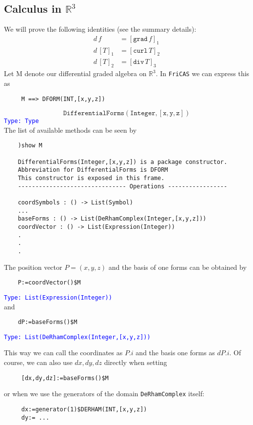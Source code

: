 \documentclass[12pt,a4paper]{article}
\newcommand{\RR}[1]{\mathbb{R}^{#1}}
\newcommand{\type}[1]{\textcolor{blue}{\tt\tiny #1}}
\begin{document}
\subsection{Calculus in $\RR 3$}
We will prove the following identities (see the summary %
details):
\begin{eqnarray*}
    d\,f &= [\mathtt{grad}\,f]_1 \\
    d\,[T]_1 &= [\mathtt{curl}\,T]_2 \\
    d\,[T]_2 &= [\mathtt{div}\,T]_3
\end{eqnarray*}
Let M denote our differential graded algebra on $\RR 3$. In
{\tt FriCAS} we can express this as
\begin{lstlisting}
     M ==> DFORM(INT,[x,y,z])
\end{lstlisting}
\begin{displaymath}
  \mathtt{DifferentialForms(Integer,[x,y,z])}
\end{displaymath}
\type{Type: Type}
\\
The list of available methods can be seen by
\begin{lstlisting}
    )show M
    
    DifferentialForms(Integer,[x,y,z]) is a package constructor.
    Abbreviation for DifferentialForms is DFORM
    This constructor is exposed in this frame.
    ------------------------------- Operations -----------------

    coordSymbols : () -> List(Symbol)
    ...
    baseForms : () -> List(DeRhamComplex(Integer,[x,y,z]))
    coordVector : () -> List(Expression(Integer))
    .
    .
    .
\end{lstlisting}
The position vector $P=(x,y,z)$ and the basis of one forms can be
obtained by
\begin{lstlisting}
    P:=coordVector()$M
\end{lstlisting}
\begin{displaymath}
    [x,y,z]
\end{displaymath}
\type{Type: List(Expression(Integer))}
\\
and
\begin{lstlisting}
    dP:=baseForms()$M
\end{lstlisting}
\begin{displaymath}
  [dx,dy,dz]
\end{displaymath}
\type{Type: List(DeRhamComplex(Integer,[x,y,z]))}

This way we can call the coordinates as $P.i$ and the basis one forms
as $dP.i$. Of course, we can also use $dx,dy,dz$ directly when
setting
\begin{lstlisting}
     [dx,dy,dz]:=baseForms()$M
\end{lstlisting}
or when we use the generators of the domain {\tt DeRhamComplex} itself:
\begin{lstlisting}   
     dx:=generator(1)$DERHAM(INT,[x,y,z])
     dy:= ...    
\end{lstlisting}
\end{document}
